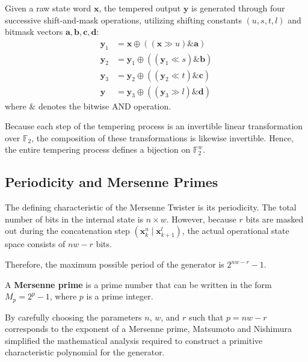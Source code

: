 Given a raw state word $\mathbf{x}$, the tempered output $\mathbf{y}$ is generated through four successive shift-and-mask operations, utilizing shifting constants $(u, s, t, l)$ and bitmask vectors $\mathbf{a}, \mathbf{b}, \mathbf{c}, \mathbf{d}$:\begin{align*}
    \mathbf{y}_1 &= \mathbf{x} \oplus ((\mathbf{x} \gg u)
    \mathbin{\&} \mathbf{a}) \\
    \mathbf{y}_2 &= \mathbf{y}_1 \oplus ((\mathbf{y}_1 \ll s) \mathbin{\&} \mathbf{b}) \\
    \mathbf{y}_3 &= \mathbf{y}_2 \oplus ((\mathbf{y}_2 \ll t) \mathbin{\&} \mathbf{c}) \\
    \mathbf{y} &= \mathbf{y}_3 \oplus
    \left( (\mathbf{y}_3 \gg l) \mathbin{\&} \mathbf{d} \right)
\end{align*}
where $\mathbin{\&}$ denotes the bitwise AND operation.

\begin{theorem}
Because each step of the tempering process is an invertible linear transformation over $\mathbb{F}_2$, the composition of these transformations is likewise invertible. Hence, the entire tempering process defines a bijection on $\mathbb{F}_2^w$.
\end{theorem}

\subsection{Periodicity and Mersenne Primes}

The defining characteristic of the Mersenne Twister is its periodicity. The total number of bits in the internal state is $n \times w$. However, because $r$ bits are masked out during the concatenation step $\left( \mathbf{x}_k^u \mid \mathbf{x}_{k+1}^l \right)$, the actual operational state space consists of $nw - r$ bits. 

Therefore, the maximum possible period of the generator is $2^{nw - r} - 1$. 

\begin{definition}
A \textbf{Mersenne prime} is a prime number that can be written in the form $M_p = 2^p - 1$, where $p$ is a prime integer.
\end{definition}

By carefully choosing the parameters $n$, $w$, and $r$ such that $p = nw - r$ corresponds to the exponent of a Mersenne prime, Matsumoto and Nishimura simplified the mathematical analysis required to construct a primitive characteristic polynomial for the generator.

